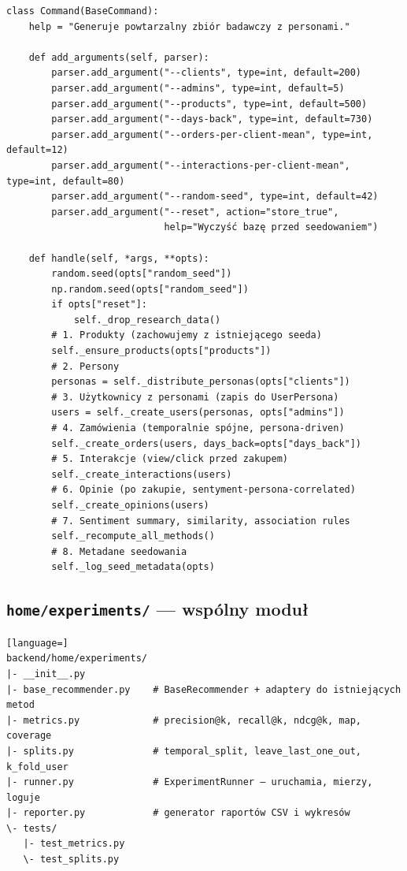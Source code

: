 \documentclass[a4paper,11pt]{article}
\begin{document}
\begin{lstlisting}
class Command(BaseCommand):
    help = "Generuje powtarzalny zbiór badawczy z personami."

    def add_arguments(self, parser):
        parser.add_argument("--clients", type=int, default=200)
        parser.add_argument("--admins", type=int, default=5)
        parser.add_argument("--products", type=int, default=500)
        parser.add_argument("--days-back", type=int, default=730)
        parser.add_argument("--orders-per-client-mean", type=int, default=12)
        parser.add_argument("--interactions-per-client-mean", type=int, default=80)
        parser.add_argument("--random-seed", type=int, default=42)
        parser.add_argument("--reset", action="store_true",
                            help="Wyczyść bazę przed seedowaniem")

    def handle(self, *args, **opts):
        random.seed(opts["random_seed"])
        np.random.seed(opts["random_seed"])
        if opts["reset"]:
            self._drop_research_data()
        # 1. Produkty (zachowujemy z istniejącego seeda)
        self._ensure_products(opts["products"])
        # 2. Persony
        personas = self._distribute_personas(opts["clients"])
        # 3. Użytkownicy z personami (zapis do UserPersona)
        users = self._create_users(personas, opts["admins"])
        # 4. Zamówienia (temporalnie spójne, persona-driven)
        self._create_orders(users, days_back=opts["days_back"])
        # 5. Interakcje (view/click przed zakupem)
        self._create_interactions(users)
        # 6. Opinie (po zakupie, sentyment-persona-correlated)
        self._create_opinions(users)
        # 7. Sentiment summary, similarity, association rules
        self._recompute_all_methods()
        # 8. Metadane seedowania
        self._log_seed_metadata(opts)
\end{lstlisting}

\subsection{\texttt{home/experiments/} --- wspólny moduł}

\begin{lstlisting}[language=]
backend/home/experiments/
|- __init__.py
|- base_recommender.py    # BaseRecommender + adaptery do istniejących metod
|- metrics.py             # precision@k, recall@k, ndcg@k, map, coverage
|- splits.py              # temporal_split, leave_last_one_out, k_fold_user
|- runner.py              # ExperimentRunner — uruchamia, mierzy, loguje
|- reporter.py            # generator raportów CSV i wykresów
\- tests/
   |- test_metrics.py
   \- test_splits.py
\end{lstlisting}
\end{document}
